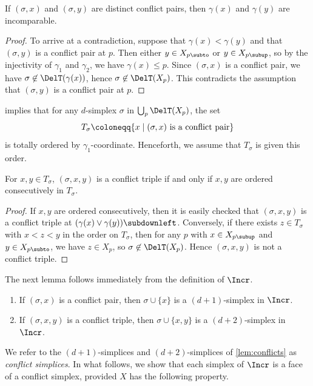 %
\begin{lemma}\label{lem:incomparable_conflicts}
    If $(\sigma,x)$ and $(\sigma,y)$ are distinct conflict pairs, then $\gamma(x)$ and $\gamma(y)$ are incomparable.
\end{lemma}
%
\begin{proof}
To arrive at a contradiction, suppose that $\gamma(x)<\gamma(y)$ and that $(\sigma,y)$ is a conflict pair at $p$.  Then either $y\in X_{p{\subto}}$ or $y\in X_{p{\subup}}$, so by the injectivity of $\gamma_1$ and $\gamma_2$, we have $\gamma(x)\leq p.$  Since $(\sigma,x)$ is a conflict pair, we have $\sigma\not\in \DelT(\gamma(x))$, hence $\sigma\not\in\DelT(X_p)$.  This contradicts the assumption that $(\sigma,y)$ is a conflict pair at $p$. 
\end{proof}
%
%
 implies that for any $d$-simplex $\sigma$ in $\bigcup_p \DelT(X_p)$, the set  \[T_{\sigma}\coloneqq\{x \mid (\sigma,x)\textup{ is a conflict pair}\}\] is totally ordered by $\gamma_1$-coordinate.  Henceforth, we assume that $T_{\sigma}$ is given this order.
%
\begin{lemma}\label{lem:consec_order_conflict_triple}
For $x,y\in T_{\sigma}$, $(\sigma,x,y)$ is a conflict triple if and only if $x,y$ are ordered consecutively in $T_{\sigma}$.
\end{lemma}
%
\begin{proof}
If $x,y$ are ordered consecutively, then it is easily checked that $(\sigma,x,y)$ is a conflict triple at $(\gamma(x) \vee \gamma(y)){\subdownleft}$.  Conversely, if there exists $z\in T_{\sigma}$ with $x<z<y$ in the order on $T_{\sigma}$, then for any $p$ with $x\in X_{p\subup}$ and  $y\in X_{p\subto}$, we have $z\in X_{p}$, so $\sigma\not \in \DelT(X_p)$.  Hence $(\sigma,x,y)$ is  not a conflict triple.   
\end{proof}
%
%
The next lemma follows immediately from the definition of $\Incr$.
%
\begin{lemma}\label{lem:conflicts}\mbox{}
\begin{enumerate}
\item[(i)] If $(\sigma, x)$ is a conflict pair, then  $\sigma \cup \{x\}$  is a $(d+1)$-simplex in $\Incr$. 
\item[(ii)] If $(\sigma, x, y)$ is a conflict triple, then $\sigma \cup \{x, y\}$ is a $(d+2)$-simplex in~$\Incr$.
\end{enumerate}
\end{lemma}
%
We refer to the $(d+1)$-simplices and  $(d+2)$-simplices of \cref{lem:conflicts} as \emph{conflict simplices}.  In what follows, we show that each simplex of $\Incr$ is a face of a conflict simplex, provided $X$ has the following property.  
